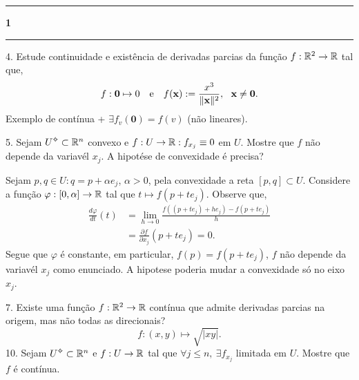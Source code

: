 \newcommand{\F}{\mathbb{F}}
\newcommand{\C}{\mathbb{C}}
\newcommand{\an}{\mathscr{A}} 
\newcommand{\Q}{\mathbb{Q}}
\renewcommand{\hom}{\operatorname{Hom}}
\newcommand{\ehom}{\operatorname{End}}
\newcommand{\0}{\textbf{0}}

\-\vspace{-0.3cm}
  {\hrule \vspace{-0.15cm}
  \centering \textbf{1} \vspace{0.1cm}
  \hrule}

4. Estude continuidade e existência de derivadas parcias da função \(f: \mathbb{R}^2 \to \mathbb{R} \) tal que, 
\[f: \textbf{0}\mapsto 0 \text{ \ \ e \ \ } f(\textbf{x}) :=  \frac{x^3}{\|\textbf{x}\|^2}, \ \ \textbf{x} \neq \textbf{0}.\] 
\textcolor{gris}{
    Exemplo de contínua + \(\exists f_v(\0) = f(v)\) (não lineares). 
}

%
5. Sejam \(U\ab \subset \R^n\) convexo e \(f: U \to \mathbb{R} : f_{x_j}\equiv 0\) em \(U\). Mostre que \(f \) não depende da variavél \(x_j\). A hipotése de convexidade é precisa?

\textcolor{gris}{Sejam \(p,q \in U: q = p + \alpha e_j\), \(\alpha>0\), pela convexidade a reta \([p,q] \subset U\). Considere a função \(\varphi: [0, \alpha] \to  \mathbb{R}\) tal que  \( t \mapsto f(p + te_j)\). Observe que, 
\begin{align*}
    \frac{d\varphi}{dt}(t) &= \lim_{h\to 0} \frac{f((p+te_j)+ he_j) - f(p+te_j) }{h} \\ 
     &= \frac{\partial f}{\partial x_j}(p + te_j) = 0.  
\end{align*}
Segue que \(\varphi\) é constante, em particular, \(f(p) = f(p +te_j)\), \(f\) não depende da variavél \(x_j\) como enunciado. A hipotese poderia mudar a convexidade só no eixo \(x_j\). 
}

7. Existe uma função \(f:\mathbb{R}^2 \to \mathbb{R}\) contínua que admite derivadas parcias na origem, mas não todas as  direcionais? 
\textcolor{gris}{
\[f: (x,y) \mapsto \sqrt{|xy|}.\]
}
10. Sejam \(U\ab \subset \R^n\) e \(f: U \to \mathbb{R}  \) tal que \(\forall j \leq n, \ \exists f_{x_j} \) limitada em \(U\). Mostre que \(f \) é contínua. 

